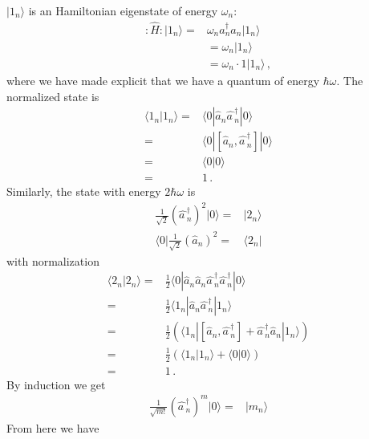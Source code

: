 $|1_n\rangle$ is an Hamiltonian eigenstate of energy $\omega_n$:
\begin{align}
  :\widehat{H}:|1_n\rangle =&\omega_n a_n^\dagger a_n |1_n\rangle \nonumber\\ 
&=\omega_n|1_n\rangle\nonumber\\
&=\omega_n\cdot 1|1_n\rangle\,,
\end{align}
where we have made explicit that we have a quantum of energy $\hbar\omega$. The normalized state is
\begin{align}
  \langle1_n|1_n\rangle=&\langle0|\widehat{a}_{n}\widehat{a\,}_{n}^\dagger|0\rangle\nonumber\\
  =&\langle0|\left[\widehat{a}_{n},\widehat{a\,}_{n}^\dagger\right]|0\rangle\nonumber\\
  =&\langle0|0\rangle\nonumber\\
  =&1\,.
\end{align}
Similarly, the state with energy $2\hbar\omega$ is
\begin{align}
\frac{1}{\sqrt{2}} \left(\widehat{a\,}_{n}^\dagger\right)^2 |0\rangle=&|2_n\rangle\nonumber\\
  \langle0|\frac{1}{\sqrt{2}}\left(\widehat{a}_{n}\right)^2=&\langle2_n|
\end{align}
with normalization
\begin{align}
  \langle2_n|2_n\rangle=&\frac{1}{2}\langle0|\widehat{a}_{n}\widehat{a}_{n}\widehat{a\,}_{n}^\dagger\widehat{a\,}_{n}^\dagger|0\rangle\nonumber\\
=&\frac{1}{2}\langle1_n|\widehat{a}_{n}\widehat{a\,}_{n}^\dagger|1_n\rangle\nonumber\\
=&\frac{1}{2}\left(\langle1_n|\left[\widehat{a}_{n},\widehat{a\,}_{n}^\dagger\right]+\widehat{a\,}_{n}^\dagger\widehat{a}_{n}|1_n\rangle\right)\nonumber\\
=&\frac{1}{2}\left(\langle1_n|1_n\rangle+\langle0|0\rangle\right)\nonumber\\
  =&1\,.
\end{align}
By induction we get
\begin{align}
\label{eq:128}
\frac{1}{\sqrt{m!}} \left(\widehat{a\,}_{n}^\dagger\right)^m |0\rangle=&|m_n\rangle
\end{align}
From here we have 

